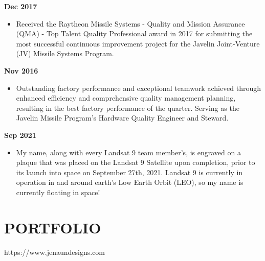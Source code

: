 \documentclass[AutoFakeBold]{resume}
\begin{document}
 {\textbf{Dec 2017}}
\begin{itemize}
    \item  Received the Raytheon Missile Systems - Quality and Mission Assurance (QMA) - Top Talent Quality Professional award in 2017 for submitting the most successful continuous improvement project for the Javelin Joint-Venture (JV) Missile Systems Program.
\end{itemize}
 {\textbf{Nov 2016}}
\begin{itemize}
    \item  Outstanding factory performance and exceptional teamwork achieved through enhanced efficiency and comprehensive quality management planning, resulting in the best factory performance of the quarter. Serving as the Javelin Missile Program's Hardware Quality Engineer and Steward.
\end{itemize}
 {\textbf{Sep 2021}}
\begin{itemize}
    \item  My name, along with every Landsat 9 team member’s, is engraved on a plaque that was placed on the Landsat 9 Satellite upon completion, prior to its launch into space on September 27th, 2021. Landsat 9 is currently in operation in and around earth's Low Earth Orbit (LEO), so my name is currently floating in space!
\end{itemize}
\vspace{5mm}
\section{\makebox[.75em][c]{\faPaperPlane} \textbf{PORTFOLIO}}
 {https://www.jenaundesigns.com}{}
 \vspace{5mm}
\end{document}
